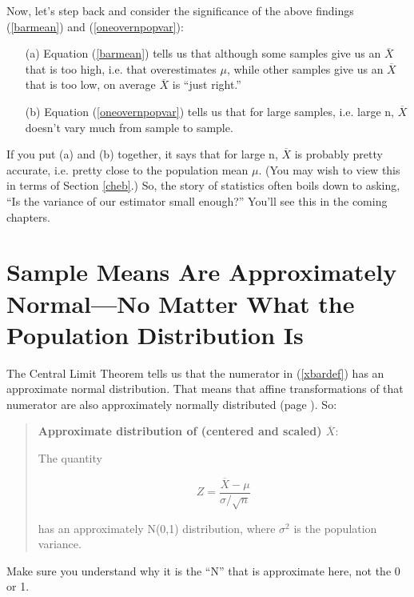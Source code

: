 Now, let's step back and consider the significance of the above
findings (\ref{barmean}) and (\ref{oneovernpopvar}):

\begin{itemize}

\item [(a)] Equation (\ref{barmean}) tells us that although some samples give
us an $\overline{X}$ that is too high, i.e. that overestimates $\mu$,
while other samples give us an $\overline{X}$ that is too low, on
average $\overline{X}$ is ``just right.''

\item [(b)] Equation (\ref{oneovernpopvar}) tells us that for large samples,
i.e. large n, $\overline{X}$ doesn't vary much from sample to sample.

\end{itemize}

If you put (a) and (b) together, it says that for large n,
$\overline{X}$ is probably pretty accurate, i.e. pretty close to the
population mean $\mu$.  (You may wish to view this in terms of Section
\ref{cheb}.)  So, the story of statistics often boils down to asking,
``Is the variance of our estimator small enough?''  You'll see this in
the coming chapters.

\section{Sample Means Are Approximately Normal---No Matter What the
Population Distribution Is}
\label{xbarclt}

The Central Limit Theorem tells us that the numerator in (\ref{xbardef})
has an approximate normal distribution.  That means that affine
transformations of that numerator are also approximately normally
distributed (page \pageref{affine}).  So:

\begin{quote}
{\bf Approximate distribution of (centered and scaled) $\overline{X}$}:

The quantity 

\begin{equation}
\label{firstz}
Z = \frac{\overline{X}-\mu}{\sigma/\sqrt{n}}
\end{equation}

has an approximately N(0,1) distribution, where $\sigma^2$ is the
population variance.
\end{quote}

Make sure you understand why it is the ``N'' that is approximate here, not
the 0 or 1.  

